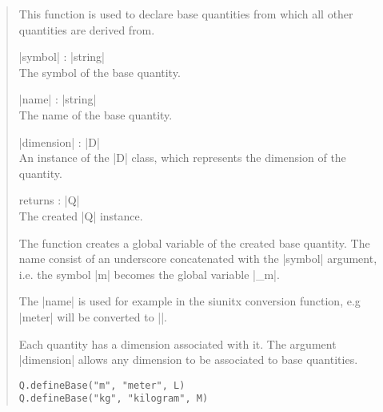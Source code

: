 \documentclass{ltxdoc}
\begin{document}
\begin{quote}
  This function is used to declare base quantities from which all other quantities are derived from.

  \begin{description}
  \item |symbol| : |string|\\
    The symbol of the base quantity.

  \item |name| : |string|\\
    The name of the base quantity.

  \item |dimension| : |D|\\
    An instance of the |D| class, which represents the dimension of the quantity.

  \item returns : |Q|\\
    The created |Q| instance.
  \end{description}

  The function creates a global variable of the created base quantity. The name consist of an underscore concatenated with the |symbol| argument, i.e. the symbol |m| becomes the global variable |_m|.

  The |name| is used for example in the siunitx conversion function, e.g |meter| will be converted to |\meter|. 

  Each quantity has a dimension associated with it. The argument |dimension| allows any dimension to be associated to base quantities.

  \begin{lstlisting}
Q.defineBase("m", "meter", L)
Q.defineBase("kg", "kilogram", M)
  \end{lstlisting}
\end{quote}
\end{document}
